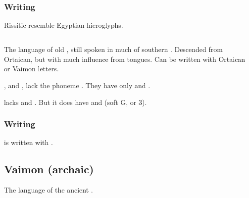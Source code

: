 




\subsubsection{Writing}
Rissitic  resemble Egyptian hieroglyphs. 









\subsection{\Tepharin}
The language of old \Tephar, still spoken in much of southern \Velcad. 
Descended from Ortaican, but with much influence from \human{} tongues. 
Can be written with Ortaican or Vaimon letters. 

\Tepharin, and \Ortaican, lack the phoneme \txipa{[v]}. 
They have only \txipa{[w]} and \txipa{[hw]}. 

\Tepharin{} lacks \txipa{[z]} and \txipa{[S]}.
But it does have \txipa{[D]} and \txipa{[3]} (soft G, or 3). 










\subsubsection{Writing}
\Tepharin{} is written with . 









\subsection{Vaimon (archaic)}
The language of the ancient . 









